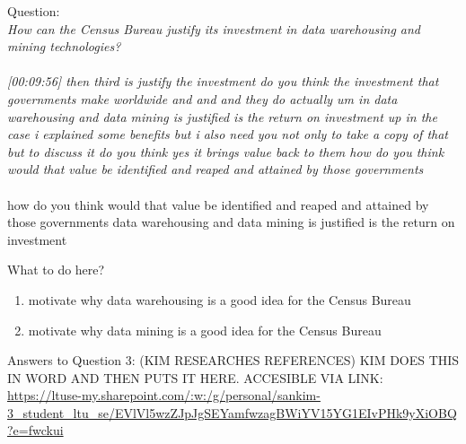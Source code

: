 Question:\\
\emph{
    How can the Census Bureau justify its investment in data warehousing and mining
technologies?
}\\\\

\emph{[00:09:56] then third is justify the investment do you think the investment that governments make worldwide
and and and they do actually um in data warehousing and data mining is justified is the return on investment
up in the case i explained some benefits but i also need you not only to take a copy of that but
to discuss it do you think yes it brings value back to them how do you think would that value be
identified and reaped and attained by those governments}\\\\
how do you think would that value be
identified and reaped and attained by those governments
data warehousing and data mining is justified is the return on investment

What to do here?
\begin{enumerate}
    \item motivate why data warehousing is a good idea for the Census Bureau
    \item motivate why data mining is a good idea for the Census Bureau
  \end{enumerate}

\newpage Answers to Question 3: (KIM RESEARCHES REFERENCES)
KIM DOES THIS IN WORD AND THEN PUTS IT HERE. ACCESIBLE VIA LINK:\\
\url{https://ltuse-my.sharepoint.com/:w:/g/personal/sankim-3_student_ltu_se/EVlVl5wzZJpJgSEYamfwzagBWiYV15YG1EIvPHk9yXiOBQ?e=fwckui}

